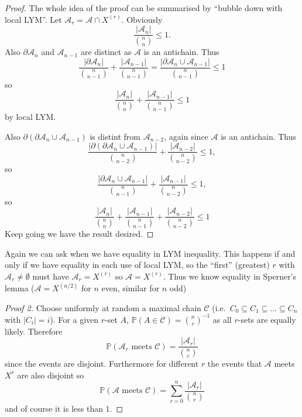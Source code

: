 \documentclass[a4paper]{article}
\newcommand{\shadow}{\partial}
\renewcommand{\P}{\mathbb P}
\begin{document}
\begin{proof}
  The whole idea of the proof can be summarised by ``bubble down with local LYM''. Let \(\mathcal A_r = \mathcal A \cap X^{(r)}\). Obviously
  \[
    \frac{|\mathcal A_n|}{\binom{n}{n}} \leq 1.
  \]
  Also \(\shadow \mathcal A_n\) and \(\mathcal A_{n - 1}\) are distinct as \(\mathcal A\) is an antichain. Thus
  \[
    \frac{|\shadow \mathcal A_n|}{\binom{n}{n - 1}} + \frac{|\mathcal A_{n - 1}|}{\binom{n}{n - 1}}
    = \frac{|\shadow \mathcal A_n \cup \mathcal A_{n - 1}|}{\binom{n}{n - 1}} \leq 1
  \]
  so
  \[
    \frac{|\mathcal A_n|}{\binom{n}{n}} + \frac{|\mathcal A_{n - 1}|}{\binom{n}{n - 1}} \leq 1
  \]
  by local LYM.

  Also \(\shadow (\shadow \mathcal A_n \cup \mathcal A_{n - 1})\) is distint from \(\mathcal A_{n - 2}\), again since \(\mathcal A\) is an antichain. Thus
  \[
    \frac{|\shadow (\shadow \mathcal A_n \cup \mathcal A_{n -1})|}{\binom{n}{n - 2}} +\frac{|\mathcal A_{n - 2}|}{\binom{n}{n - 2}} \leq 1,
  \]
  so
  \[
    \frac{|\shadow \mathcal A_n \cup \mathcal A_{n - 1}|}{\binom{n}{n - 1}} + \frac{|\mathcal A_{n - 1}|}{\binom{n}{n - 2}} \leq 1,
  \]
  so
  \[
    \frac{|\mathcal A_n|}{\binom{n}{n}} + \frac{|\mathcal A_{n - 1}|}{\binom{n}{n - 1}} + \frac{|\mathcal A_{n - 2}|}{\binom{n}{n - 2}} \leq 1
  \]
  Keep going we have the result desired.
\end{proof}

Again we can ask when we have equality in LYM inequality. This happens if and only if we have equality in each use of local LYM, so the ``first'' (greatest) \(r\) with \(\mathcal A_r \neq \emptyset\) must have \(\mathcal A_r = X^{(r)}\) so \(\mathcal A = X^{(r)}\). Thus we know equality in Sperner's lemma (\(\mathcal A = X^{(n/2)}\) for \(n\) even, similar for \(n\) odd)

\begin{proof}[Proof 2]
  Choose uniformly at random a maximal chain \(\mathcal C\) (i.e.\ \(C_0 \subseteq C_1 \subseteq \dots \subseteq C_n\) with \(|C_i| = i\)). For a given \(r\)-set \(A\), \(\P(A \in \mathcal C) = \binom{n}{r}^{-1}\) as all \(r\)-sets are equally likely. Therefore
  \[
    \P(\mathcal A_r \text{ meets } \mathcal C) = \frac{|\mathcal A_r|}{\binom{n}{r}}
  \]
  since the events are disjoint. Furthermore for different \(r\) the events that \(\mathcal A\) meets \(X^r\) are also disjoint so
  \[
    \P(\mathcal A \text{ meets } \mathcal C) = \sum_{r = 0}^n \frac{|\mathcal A_r|}{\binom{n}{r}}
  \]
  and of course it is less than \(1\).
\end{proof}
\end{document}
